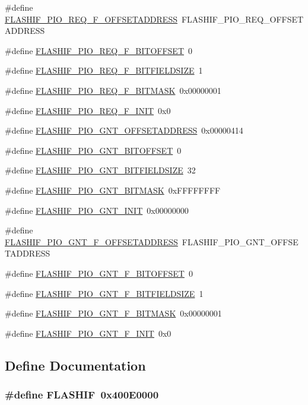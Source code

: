 \begin{DoxyCompactItemize}
\item 
\#define \hyperlink{a00552_a90cd8a3cbd9865c964b5df00d39a4d04}{FLASHIF\_\-PIO\_\-REQ\_\-F\_\-OFFSETADDRESS}~FLASHIF\_\-PIO\_\-REQ\_\-OFFSETADDRESS
\item 
\#define \hyperlink{a00552_ae6234f141b1ecea4277adab2cafd1f60}{FLASHIF\_\-PIO\_\-REQ\_\-F\_\-BITOFFSET}~0
\item 
\#define \hyperlink{a00552_a2fd39b25c5c410c5aab8835fd0499bb5}{FLASHIF\_\-PIO\_\-REQ\_\-F\_\-BITFIELDSIZE}~1
\item 
\#define \hyperlink{a00552_a31d3454786e7f96216005e708111629d}{FLASHIF\_\-PIO\_\-REQ\_\-F\_\-BITMASK}~0x00000001
\item 
\#define \hyperlink{a00552_a6c1873fdecff13797720b9ddcf48b2f2}{FLASHIF\_\-PIO\_\-REQ\_\-F\_\-INIT}~0x0
\item 
\#define \hyperlink{a00552_aada2112b1fc8a7c3d3415697535c2cba}{FLASHIF\_\-PIO\_\-GNT\_\-OFFSETADDRESS}~0x00000414
\item 
\#define \hyperlink{a00552_a9fda92e0099272f9935898d633aa3f94}{FLASHIF\_\-PIO\_\-GNT\_\-BITOFFSET}~0
\item 
\#define \hyperlink{a00552_ab2ef838a2c1a0cd1f1d8de55db917a50}{FLASHIF\_\-PIO\_\-GNT\_\-BITFIELDSIZE}~32
\item 
\#define \hyperlink{a00552_af728ad3797817618cd61cfdd32abfee8}{FLASHIF\_\-PIO\_\-GNT\_\-BITMASK}~0xFFFFFFFF
\item 
\#define \hyperlink{a00552_a56841b54b4af6e12c6d72ad4a0105336}{FLASHIF\_\-PIO\_\-GNT\_\-INIT}~0x00000000
\item 
\#define \hyperlink{a00552_a3d65aa30dc830ca4443db190370784ae}{FLASHIF\_\-PIO\_\-GNT\_\-F\_\-OFFSETADDRESS}~FLASHIF\_\-PIO\_\-GNT\_\-OFFSETADDRESS
\item 
\#define \hyperlink{a00552_a65db3ecb9d3c688020a1bcabe66f50df}{FLASHIF\_\-PIO\_\-GNT\_\-F\_\-BITOFFSET}~0
\item 
\#define \hyperlink{a00552_a8837225c2aa64bc03101d3b1c976d8ea}{FLASHIF\_\-PIO\_\-GNT\_\-F\_\-BITFIELDSIZE}~1
\item 
\#define \hyperlink{a00552_a9f7a23d0945b1b1dc1a86734cb83a424}{FLASHIF\_\-PIO\_\-GNT\_\-F\_\-BITMASK}~0x00000001
\item 
\#define \hyperlink{a00552_a3a19d5b41913a98cf2e769460b823807}{FLASHIF\_\-PIO\_\-GNT\_\-F\_\-INIT}~0x0
\end{DoxyCompactItemize}


\subsection{Define Documentation}
\hypertarget{a00552_aad1373abc9f9c93f8762d989ddad64d8}{
\subsubsection[{FLASHIF}]{\setlength{\rightskip}{0pt plus 5cm}\#define FLASHIF~0x400E0000}}
\label{a00552_aad1373abc9f9c93f8762d989ddad64d8}


